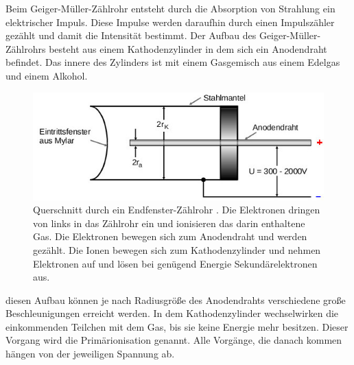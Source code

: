 Beim Geiger-Müller-Zählrohr entsteht durch die Absorption von Strahlung ein elektrischer Impuls.
Diese Impulse werden daraufhin durch einen Impulszähler gezählt und damit die Intensität bestimmt.
Der Aufbau des Geiger-Müller-Zählrohrs besteht aus einem Kathodenzylinder in dem sich ein Anodendraht befindet.
Das innere des Zylinders ist mit einem Gasgemisch aus einem Edelgas und einem Alkohol. 
\begin{figure}[H]
    \centering
    \includegraphics[width=\linewidth]{images/endfenster.jpg}
    \caption{Querschnitt durch ein Endfenster-Zählrohr \cite{V703}.
    Die Elektronen dringen von links in das Zählrohr ein und ionisieren das darin enthaltene Gas.
    Die Elektronen bewegen sich zum Anodendraht und werden gezählt. Die Ionen bewegen
    sich zum Kathodenzylinder und nehmen Elektronen auf und lösen bei genügend Energie Sekundärelektronen aus.
    }
    \label{fig:1}
\end{figure}
\justifying diesen Aufbau können je nach Radiusgröße des Anodendrahts verschiedene 
große Beschleunigungen erreicht werden.
In dem Kathodenzylinder wechselwirken die einkommenden Teilchen mit dem Gas, bis sie
keine Energie mehr besitzen. Dieser Vorgang wird die Primärionisation genannt.
Alle Vorgänge, die danach kommen hängen von der jeweiligen Spannung ab.
